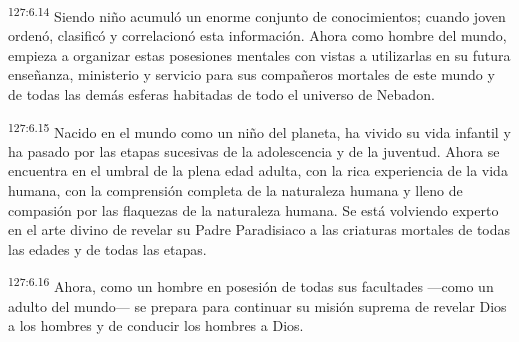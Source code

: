 \par 
\textsuperscript{127:6.14} Siendo niño acumuló un enorme conjunto de conocimientos; cuando joven ordenó, clasificó y correlacionó esta información. Ahora como hombre del mundo, empieza a organizar estas posesiones mentales con vistas a utilizarlas en su futura enseñanza, ministerio y servicio para sus compañeros mortales de este mundo y de todas las demás esferas habitadas de todo el universo de Nebadon.

\par 
\textsuperscript{127:6.15} Nacido en el mundo como un niño del planeta, ha vivido su vida infantil y ha pasado por las etapas sucesivas de la adolescencia y de la juventud. Ahora se encuentra en el umbral de la plena edad adulta, con la rica experiencia de la vida humana, con la comprensión completa de la naturaleza humana y lleno de compasión por las flaquezas de la naturaleza humana. Se está volviendo experto en el arte divino de revelar su Padre Paradisiaco a las criaturas mortales de todas las edades y de todas las etapas.

\par 
\textsuperscript{127:6.16} Ahora, como un hombre en posesión de todas sus facultades ---como un adulto del mundo--- se prepara para continuar su misión suprema de revelar Dios a los hombres y de conducir los hombres a Dios.